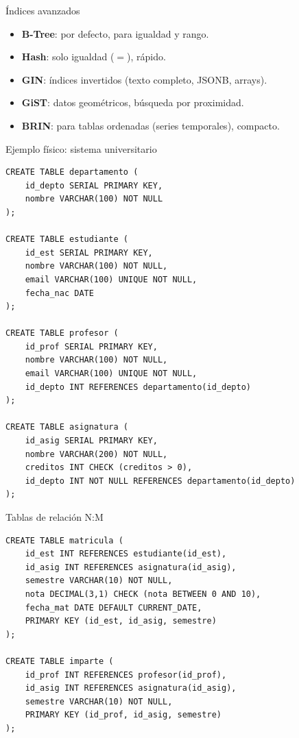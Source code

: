 \documentclass[aspectratio=169, 10pt, xcolor=table]{beamer}
\begin{document}
\begin{frame}{Índices avanzados}
    \begin{itemize}
        \item \textbf{B-Tree}: por defecto, para igualdad y rango.
        \item \textbf{Hash}: solo igualdad ($=$), rápido.
        \item \textbf{GIN}: índices invertidos (texto completo, JSONB, arrays).
        \item \textbf{GiST}: datos geométricos, búsqueda por proximidad.
        \item \textbf{BRIN}: para tablas ordenadas (series temporales), compacto.
    \end{itemize}
\end{frame}

\begin{frame}[fragile]{Ejemplo físico: sistema universitario}
    \begin{lstlisting}
CREATE TABLE departamento (
    id_depto SERIAL PRIMARY KEY,
    nombre VARCHAR(100) NOT NULL
);

CREATE TABLE estudiante (
    id_est SERIAL PRIMARY KEY,
    nombre VARCHAR(100) NOT NULL,
    email VARCHAR(100) UNIQUE NOT NULL,
    fecha_nac DATE
);

CREATE TABLE profesor (
    id_prof SERIAL PRIMARY KEY,
    nombre VARCHAR(100) NOT NULL,
    email VARCHAR(100) UNIQUE NOT NULL,
    id_depto INT REFERENCES departamento(id_depto)
);

CREATE TABLE asignatura (
    id_asig SERIAL PRIMARY KEY,
    nombre VARCHAR(200) NOT NULL,
    creditos INT CHECK (creditos > 0),
    id_depto INT NOT NULL REFERENCES departamento(id_depto)
);
    \end{lstlisting}
\end{frame}

\begin{frame}[fragile]{Tablas de relación N:M}
    \begin{lstlisting}
CREATE TABLE matricula (
    id_est INT REFERENCES estudiante(id_est),
    id_asig INT REFERENCES asignatura(id_asig),
    semestre VARCHAR(10) NOT NULL,
    nota DECIMAL(3,1) CHECK (nota BETWEEN 0 AND 10),
    fecha_mat DATE DEFAULT CURRENT_DATE,
    PRIMARY KEY (id_est, id_asig, semestre)
);

CREATE TABLE imparte (
    id_prof INT REFERENCES profesor(id_prof),
    id_asig INT REFERENCES asignatura(id_asig),
    semestre VARCHAR(10) NOT NULL,
    PRIMARY KEY (id_prof, id_asig, semestre)
);
    \end{lstlisting}
\end{frame}
\end{document}
